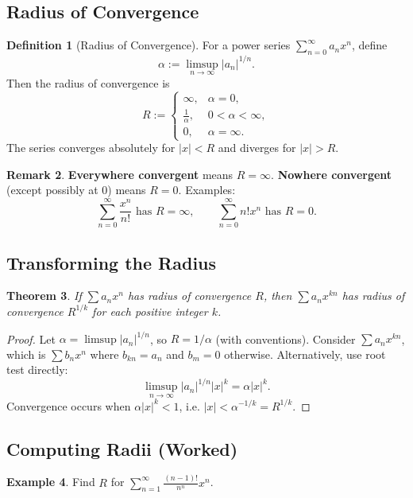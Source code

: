\documentclass[12pt]{article}
\newtheorem{theorem}{Theorem}[section]
\theoremstyle{definition}
\newtheorem{definition}[theorem]{Definition}
\newtheorem{example}[theorem]{Example}
\newtheorem{remark}[theorem]{Remark}
\begin{document}
\subsection{Radius of Convergence}

\begin{definition}[Radius of Convergence]
For a power series $\sum_{n=0}^\infty a_n x^n$, define
\[
\alpha:=\limsup_{n\to\infty} |a_n|^{1/n}.
\]
Then the radius of convergence is
\[
R:=\begin{cases}
\infty,& \alpha=0,\\
\frac{1}{\alpha},& 0<\alpha<\infty,\\
0,& \alpha=\infty.
\end{cases}
\]
The series converges absolutely for $|x|<R$ and diverges for $|x|>R$.
\end{definition}

\begin{remark}
\textbf{Everywhere convergent} means $R=\infty$. \textbf{Nowhere convergent} (except possibly at $0$) means $R=0$.
Examples:
\[
\sum_{n=0}^\infty \frac{x^n}{n!} \text{ has }R=\infty,\qquad
\sum_{n=0}^\infty n!x^n \text{ has }R=0.
\]
\end{remark}

\subsection{Transforming the Radius}

\begin{theorem}
If $\sum a_n x^n$ has radius of convergence $R$, then $\sum a_n x^{kn}$ has radius of convergence $R^{1/k}$
for each positive integer $k$.
\end{theorem}

\begin{proof}
Let $\alpha=\limsup |a_n|^{1/n}$, so $R=1/\alpha$ (with conventions).
Consider $\sum a_n x^{kn}$, which is $\sum b_n x^n$ where $b_{kn}=a_n$ and $b_m=0$ otherwise.
Alternatively, use root test directly:
\[
\limsup_{n\to\infty} |a_n|^{1/n} |x|^k = \alpha |x|^k.
\]
Convergence occurs when $\alpha |x|^k<1$, i.e. $|x|<\alpha^{-1/k}=R^{1/k}$.
\end{proof}

\subsection{Computing Radii (Worked)}

\begin{example}
Find $R$ for $\displaystyle \sum_{n=1}^\infty \frac{(n-1)!}{n^n} x^n$.
\end{example}
\end{document}
